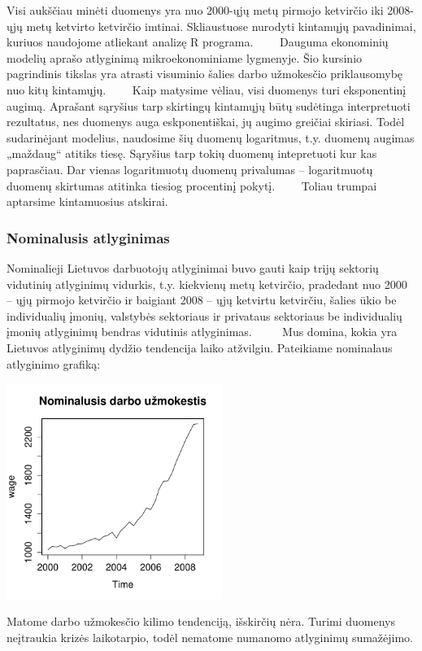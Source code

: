 \documentclass[12pt,a4paper]{article}
\theoremstyle{change}\newtheorem{salyga}{Uždavinys}
\begin{document}
Visi aukščiau minėti duomenys yra nuo 2000-ųjų metų pirmojo ketvirčio iki 2008-ųjų metų ketvirto ketvirčio imtinai. Skliaustuose nurodyti kintamųjų pavadinimai, kuriuos naudojome atliekant analizę R programa. 
\vskip 8pt
$\qquad $Dauguma ekonominių modelių aprašo atlyginimą mikroekonominiame lygmenyje. Šio kursinio pagrindinis tikslas yra atrasti visuminio šalies darbo užmokesčio priklausomybę nuo kitų kintamųjų.
\vskip 8pt
$\qquad $Kaip matysime vėliau, visi duomenys turi eksponentinį augimą. Aprašant sąryšius tarp skirtingų kintamųjų būtų sudėtinga interpretuoti rezultatus, nes duomenys auga eskponentiškai, jų augimo greičiai skiriasi. Todėl sudarinėjant modelius, naudosime šių duomenų logaritmus, t.y. duomenų augimas „maždaug“ atitiks tiesę. Sąryšius tarp tokių duomenų intepretuoti kur kas paprasčiau. Dar vienas logaritmuotų duomenų privalumas – logaritmuotų duomenų skirtumas atitinka tiesiog procentinį pokytį.
\vskip 8pt
$\qquad $Toliau trumpai aptarsime kintamuosius atskirai. 






\subsubsection{Nominalusis atlyginimas}

\hspace{40pt}Nominalieji Lietuvos darbuotojų atlyginimai buvo gauti kaip trijų sektorių vidutinių atlyginimų vidurkis, t.y. kiekvienų metų ketvirčio, pradedant nuo 2000 – ųjų pirmojo ketvirčio ir baigiant 2008 – ųjų ketvirtu ketvirčiu, šalies ūkio be individualių įmonių, valstybės sektoriaus ir privataus sektoriaus be individualių įmonių atlyginimų bendras vidutinis atlyginimas.
\vskip 8pt
$\qquad$ Mus domina, kokia yra Lietuvos atlyginimų dydžio tendencija laiko atžvilgiu. Pateikiame nominalaus atlyginimo grafiką:
\vskip 8pt
\begin{center}
\includegraphics[width=70mm,height=70mm]{nwage}
\end{center}
Matome darbo užmokesčio kilimo tendenciją, išskirčių nėra. Turimi duomenys neįtraukia krizės laikotarpio, todėl nematome  numanomo atlyginimų sumažėjimo.  
\vskip 8pt
\end{document}
